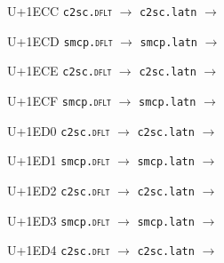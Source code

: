\documentclass{article}
\begin{document}
\begin{substitutions}
\goodbreak

U+1ECC  \linebreak
    \texttt{c2sc.\textsc{dflt}} $\to$  \linebreak
    \texttt{c2sc.latn} $\to$  

\goodbreak

U+1ECD  \linebreak
    \texttt{smcp.\textsc{dflt}} $\to$  \linebreak
    \texttt{smcp.latn} $\to$  

\goodbreak

U+1ECE  \linebreak
    \texttt{c2sc.\textsc{dflt}} $\to$  \linebreak
    \texttt{c2sc.latn} $\to$  

\goodbreak

U+1ECF  \linebreak
    \texttt{smcp.\textsc{dflt}} $\to$  \linebreak
    \texttt{smcp.latn} $\to$  

\goodbreak

U+1ED0  \linebreak
    \texttt{c2sc.\textsc{dflt}} $\to$  \linebreak
    \texttt{c2sc.latn} $\to$  

\goodbreak

U+1ED1  \linebreak
    \texttt{smcp.\textsc{dflt}} $\to$  \linebreak
    \texttt{smcp.latn} $\to$  

\goodbreak

U+1ED2  \linebreak
    \texttt{c2sc.\textsc{dflt}} $\to$  \linebreak
    \texttt{c2sc.latn} $\to$  

\goodbreak

U+1ED3  \linebreak
    \texttt{smcp.\textsc{dflt}} $\to$  \linebreak
    \texttt{smcp.latn} $\to$  

\goodbreak

U+1ED4  \linebreak
    \texttt{c2sc.\textsc{dflt}} $\to$  \linebreak
    \texttt{c2sc.latn} $\to$  


\end{substitutions}
\end{document}
